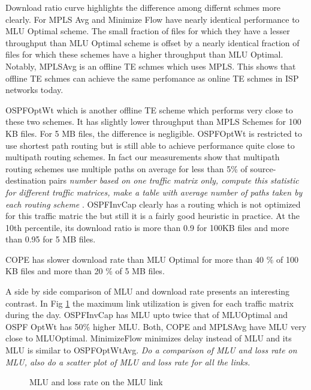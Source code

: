 Download ratio curve highlights the difference among differnt schmes more clearly. For MPLS Avg and Minimize Flow have nearly identical performance to MLU Optimal scheme. The small fraction of files for which they have a lesser throughput than MLU Optimal scheme is offset by a nearly identical fraction of files for which these schemes have a higher throughput than MLU Optimal. Notably, MPLSAvg is an offline TE schmes which uses MPLS. This shows that offline TE schmes can achieve the same perfomance as online TE schmes in ISP networks today. 

OSPFOptWt which is another offline TE scheme which performs very close to these two schemes. It has slightly lower throughput than MPLS Schemes for 100 KB files. For 5 MB files, the difference is negligible. OSPFOptWt is restricted to use shortest path routing but is still able to achieve performance quite close to multipath routing schemes. In fact our measurements show that multipath routing schemes use multiple paths on average for less than 5\% of source-destination pairs \emph{number based on one traffic matrix only, compute this statistic for different traffic matrices, make a table with average number of paths taken by each routing scheme }. OSPFInvCap clearly has a routing which is not optimized for this traffic matric the but still it is a fairly good heuristic in practice. At the 10th percentile, its download ratio is more than 0.9 for 100KB files and more than 0.95 for 5 MB files. 

COPE has slower download rate than MLU Optimal for more than 40 \% of 100 KB files and more than 20 \% of 5 MB files. 

A side by side comparison of MLU and download rate presents an interesting contrast. In Fig \ref{fig:US_ISP_MLU} the maximum link utilization is given for each traffic matrix during the day. OSPFInvCap has MLU upto twice that of MLUOptimal and OSPF OptWt has 50\% higher MLU. Both, COPE and MPLSAvg have MLU very close to MLUOptimal. MinimizeFlow minimizes delay instead of MLU and its MLU is similar to OSPFOptWtAvg.  \emph{Do a comparison of MLU and loss rate on MLU, also do a scatter plot of MLU and loss rate for all the links.}

\begin{figure}[htp]
  \begin{center}
  \end{center}
  \caption{MLU and loss rate on the MLU link}
  \label{fig:US_ISP_MLU}
\end{figure}

